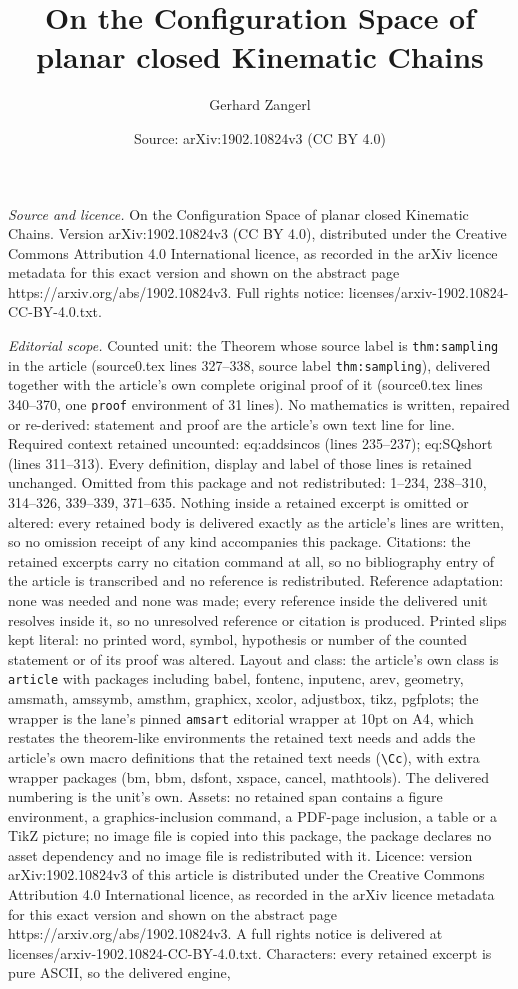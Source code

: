 \documentclass[10pt,a4paper]{amsart}
\title[On the Configuration Space of planar closed Kinematic Chains]{On the Configuration Space of planar closed Kinematic Chains}
\author{Gerhard Zangerl}
\date{Source: arXiv:1902.10824v3 (CC BY 4.0)}
\begin{document}
\maketitle

\noindent\emph{Source and licence.} On the Configuration Space of planar closed Kinematic Chains. Version arXiv:1902.10824v3 (CC BY 4.0), distributed under the Creative Commons Attribution 4.0 International licence, as recorded in the arXiv licence metadata for this exact version and shown on the abstract page https://arxiv.org/abs/1902.10824v3. Full rights notice: licenses/arxiv-1902.10824-CC-BY-4.0.txt.\par\smallskip

\noindent\textit{Editorial scope.} Counted unit: the Theorem whose source label is \texttt{thm:sampling} in the article (source0.tex lines 327--338, source label \texttt{thm:sampling}), delivered together with the article's own complete original proof of it (source0.tex lines 340--370, one \texttt{proof} environment of 31 lines). No mathematics is written, repaired or re-derived: statement and proof are the article's own text line for line. Required context retained uncounted: eq:addsincos (lines 235--237); eq:SQshort (lines 311--313). Every definition, display and label of those lines is retained unchanged. Omitted from this package and not redistributed: 1--234, 238--310, 314--326, 339--339, 371--635. Nothing inside a retained excerpt is omitted or altered: every retained body is delivered exactly as the article's lines are written, so no omission receipt of any kind accompanies this package. Citations: the retained excerpts carry no citation command at all, so no bibliography entry of the article is transcribed and no reference is redistributed. Reference adaptation: none was needed and none was made; every reference inside the delivered unit resolves inside it, so no unresolved reference or citation is produced. Printed slips kept literal: no printed word, symbol, hypothesis or number of the counted statement or of its proof was altered. Layout and class: the article's own class is \texttt{article} with packages including babel, fontenc, inputenc, arev, geometry, amsmath, amssymb, amsthm, graphicx, xcolor, adjustbox, tikz, pgfplots; the wrapper is the lane's pinned \texttt{amsart} editorial wrapper at 10pt on A4, which restates the theorem-like environments the retained text needs and adds the article's own macro definitions that the retained text needs (\texttt{\textbackslash Cc}), with extra wrapper packages (bm, bbm, dsfont, xspace, cancel, mathtools). The delivered numbering is the unit's own. Assets: no retained span contains a figure environment, a graphics-inclusion command, a PDF-page inclusion, a table or a TikZ picture; no image file is copied into this package, the package declares no asset dependency and no image file is redistributed with it. Licence: version arXiv:1902.10824v3 of this article is distributed under the Creative Commons Attribution 4.0 International licence, as recorded in the arXiv licence metadata for this exact version and shown on the abstract page https://arxiv.org/abs/1902.10824v3. A full rights notice is delivered at licenses/arxiv-1902.10824-CC-BY-4.0.txt. Characters: every retained excerpt is pure ASCII, so the delivered engine, 
\end{document}
